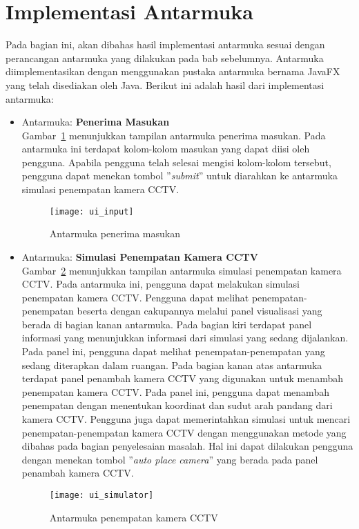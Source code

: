 \section{Implementasi Antarmuka}
Pada bagian ini, akan dibahas hasil implementasi antarmuka sesuai dengan perancangan antarmuka yang dilakukan pada bab sebelumnya. Antarmuka diimplementasikan dengan menggunakan pustaka antarmuka bernama JavaFX yang telah disediakan oleh Java. Berikut ini adalah hasil dari implementasi antarmuka:
\begin{itemize}
	\item Antarmuka: \textbf{Penerima Masukan}\\
	Gambar~\ref{fig:ui_input} menunjukkan tampilan antarmuka penerima masukan. Pada antarmuka ini terdapat kolom-kolom masukan yang dapat diisi oleh pengguna. Apabila pengguna telah selesai mengisi kolom-kolom tersebut, pengguna dapat menekan tombol ''\textit{submit}'' untuk diarahkan ke antarmuka simulasi penempatan kamera CCTV.
	\begin{figure}[H]
		\centering  
		\texttt{[image: ui\_input]}
		\caption[Antarmuka penerima masukan]{Antarmuka penerima masukan}
		\label{fig:ui_input}
	\end{figure}
	
	\item Antarmuka: \textbf{Simulasi Penempatan Kamera CCTV}\\
	Gambar~\ref{fig:ui_simulator} menunjukkan tampilan antarmuka simulasi penempatan kamera CCTV. Pada antarmuka ini, pengguna dapat melakukan simulasi penempatan kamera CCTV. Pengguna dapat melihat penempatan-penempatan beserta dengan cakupannya melalui panel visualisasi yang berada di bagian kanan antarmuka. Pada bagian kiri terdapat panel informasi yang menunjukkan informasi dari simulasi yang sedang dijalankan. Pada panel ini, pengguna dapat melihat penempatan-penempatan yang sedang diterapkan dalam ruangan. Pada bagian kanan atas antarmuka terdapat panel penambah kamera CCTV yang digunakan untuk menambah penempatan kamera CCTV. Pada panel ini, pengguna dapat menambah penempatan dengan menentukan koordinat dan sudut arah pandang dari kamera CCTV. Pengguna juga dapat memerintahkan simulasi untuk mencari penempatan-penempatan kamera CCTV dengan menggunakan metode yang dibahas pada bagian penyelesaian masalah. Hal ini dapat dilakukan pengguna dengan menekan tombol ''\textit{auto place camera}'' yang berada pada panel penambah kamera CCTV.
	\begin{figure}[H]
		\centering  
		\texttt{[image: ui\_simulator]}
		\caption[Antarmuka penempatan kamera CCTV]{Antarmuka penempatan kamera CCTV}
		\label{fig:ui_simulator}
	\end{figure}
\end{itemize}


